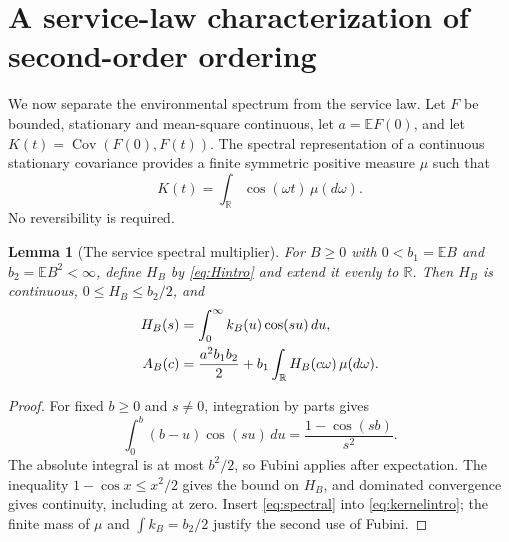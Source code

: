 \documentclass[11pt,reqno]{amsart}
\numberwithin{equation}{section}
\theoremstyle{plain}
\newtheorem{lemma}[theorem]{Lemma}
\theoremstyle{definition}
\newcommand{\E}{\mathbb E}
\newcommand{\R}{\mathbb R}
\newcommand{\1}{\mathbf 1}
\DeclareMathOperator{\Cov}{Cov}
\begin{document}
\section{A service-law characterization of second-order ordering}\label{sec:service}
We now separate the environmental spectrum from the service law. Let $F$ be bounded, stationary and mean-square continuous, let $a=\E F(0)$, and let $K(t)=\Cov(F(0),F(t))$. The spectral representation of a continuous stationary covariance \cite{Yaglom87} provides a finite symmetric positive measure $\mu$ such that
\begin{equation}\label{eq:spectral}
 K(t)=\int_{\R}\cos(\omega t)\,\mu(d\omega).
\end{equation}
No reversibility is required.

\begin{lemma}[The service spectral multiplier]\label{lem:servicefilter}
For $B\ge0$ with $0<b_1=\E B$ and $b_2=\E B^2<\infty$, define $H_B$ by \eqref{eq:Hintro} and extend it evenly to $\R$. Then $H_B$ is continuous, $0\le H_B\le b_2/2$, and
\begin{align}\label{eq:servicefilter}
 H_B(s)&=\int_0^\infty k_B(u)\cos(su)\,du,\notag\\
 A_B(c)&=\frac{a^2b_1b_2}{2}
                   +b_1\int_{\R}H_B(c\omega)\,\mu(d\omega).
\end{align}
\end{lemma}
\begin{proof}
For fixed $b\ge0$ and $s\ne0$, integration by parts gives
\[
 \int_0^b(b-u)\cos(su)\,du=\frac{1-\cos(sb)}{s^2}.
\]
The absolute integral is at most $b^2/2$, so Fubini applies after expectation. The inequality $1-\cos x\le x^2/2$ gives the bound on $H_B$, and dominated convergence gives continuity, including at zero. Insert \eqref{eq:spectral} into \eqref{eq:kernelintro}; the finite mass of $\mu$ and $\int k_B=b_2/2$ justify the second use of Fubini.
\end{proof}
\end{document}

